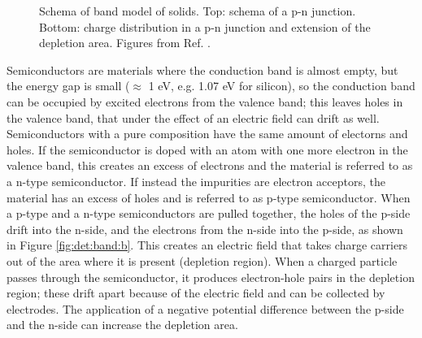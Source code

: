 \begin{figure}[ht]
\centering
{}
\caption{ Schema of band model of solids.  Top: schema of a p-n junction. Bottom: charge distribution in a p-n junction and extension of the depletion area. Figures from Ref. \cite{grupen_shwartz_2008}.}
\label{fig:det:band}
\end{figure}

Semiconductors are materials where the conduction band is almost empty, but the energy gap is small ($\approx$ 1 eV, e.g. 1.07 eV for silicon), so the conduction band can be occupied by excited electrons from the valence band; this leaves holes in the valence band, that under the effect of an electric field can drift as well. Semiconductors with a pure composition have the same amount of electorns and holes. If the semiconductor is doped with an atom with one more electron in the valence band, this creates an excess of electrons and the material is referred to as a n-type semiconductor. If instead the impurities are electron acceptors, the material has an excess of holes and is referred to as p-type semiconductor. When a p-type and a n-type semiconductors are pulled together, the holes of the p-side drift into the n-side, and the electrons from the n-side into the p-side, as shown in Figure \ref{fig:det:band:b}. This creates an electric field that takes charge carriers out of the area where it is present (depletion region). When a charged particle passes through the semiconductor, it produces electron-hole pairs in the depletion region; these drift apart because of the electric field and can be collected by electrodes. The application of a negative potential difference between the p-side and the n-side can increase the depletion area.

